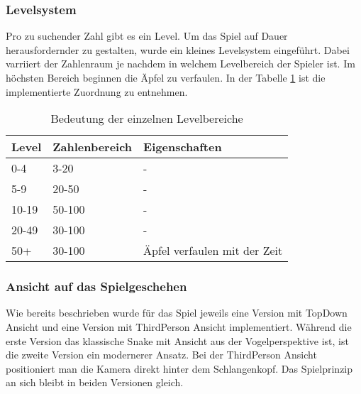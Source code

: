 \subsubsection{Levelsystem}
Pro zu suchender Zahl gibt es ein Level. Um das Spiel auf Dauer herausfordernder zu gestalten, wurde ein kleines Levelsystem eingeführt. Dabei varriiert der Zahlenraum je nachdem in welchem Levelbereich der Spieler ist. Im höchsten Bereich beginnen die Äpfel zu verfaulen. In der Tabelle \ref{tab:levels} ist die implementierte Zuordnung zu entnehmen.
\begin{table}[h!]
\centering
\begin{tabular}{|l|l|l|}
\hline
\textbf{Level} & \textbf{Zahlenbereich} & \textbf{Eigenschaften}       \\ \hline
0-4            & 3-20                   & -                            \\ \hline
5-9            & 20-50                  & -                            \\ \hline
10-19          & 50-100                 & -                            \\ \hline
20-49          & 30-100                 & -                            \\ \hline
50+            & 30-100                 & Äpfel verfaulen mit der Zeit \\ \hline
\end{tabular}
\caption{Bedeutung der einzelnen Levelbereiche\label{tab:levels}}
\end{table}

\subsubsection{Ansicht auf das Spielgeschehen}
Wie bereits beschrieben wurde für das Spiel jeweils eine Version mit TopDown Ansicht und eine Version mit ThirdPerson Ansicht implementiert. Während die erste Version das klassische Snake mit Ansicht aus der Vogelperspektive ist, ist die zweite Version ein modernerer Ansatz. Bei der ThirdPerson Ansicht positioniert man die Kamera direkt hinter dem Schlangenkopf. Das Spielprinzip an sich bleibt in beiden Versionen gleich.


